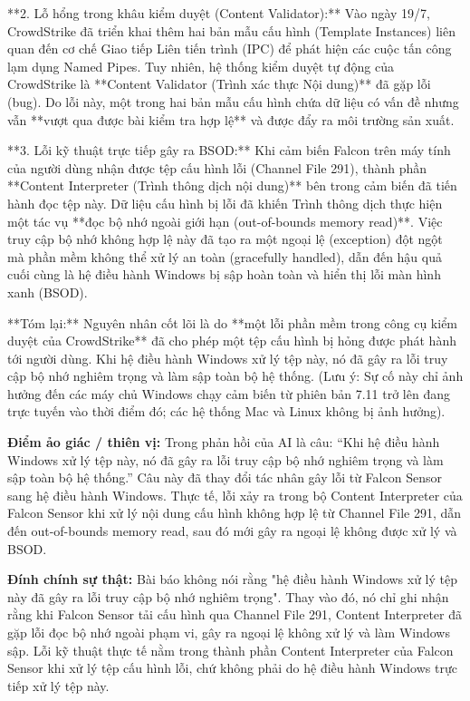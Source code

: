**2. Lỗ hổng trong khâu kiểm duyệt (Content Validator):**
Vào ngày 19/7, CrowdStrike đã triển khai thêm hai bản mẫu cấu hình (Template Instances) liên quan đến cơ chế Giao tiếp Liên tiến trình (IPC) để phát hiện các cuộc tấn công lạm dụng Named Pipes.
Tuy nhiên, hệ thống kiểm duyệt tự động của CrowdStrike là **Content Validator (Trình xác thực Nội dung)** đã gặp lỗi (bug). Do lỗi này, một trong hai bản mẫu cấu hình chứa dữ liệu có vấn đề nhưng vẫn **vượt qua được bài kiểm tra hợp lệ** và được đẩy ra môi trường sản xuất.

**3. Lỗi kỹ thuật trực tiếp gây ra BSOD:**
Khi cảm biến Falcon trên máy tính của người dùng nhận được tệp cấu hình lỗi (Channel File 291), thành phần **Content Interpreter (Trình thông dịch nội dung)** bên trong cảm biến đã tiến hành đọc tệp này.
Dữ liệu cấu hình bị lỗi đã khiến Trình thông dịch thực hiện một tác vụ **đọc bộ nhớ ngoài giới hạn (out-of-bounds memory read)**. Việc truy cập bộ nhớ không hợp lệ này đã tạo ra một ngoại lệ (exception) đột ngột mà phần mềm không thể xử lý an toàn (gracefully handled), dẫn đến hậu quả cuối cùng là hệ điều hành Windows bị sập hoàn toàn và hiển thị lỗi màn hình xanh (BSOD).

**Tóm lại:** Nguyên nhân cốt lõi là do **một lỗi phần mềm trong công cụ kiểm duyệt của CrowdStrike** đã cho phép một tệp cấu hình bị hỏng được phát hành tới người dùng. Khi hệ điều hành Windows xử lý tệp này, nó đã gây ra lỗi truy cập bộ nhớ nghiêm trọng và làm sập toàn bộ hệ thống. (Lưu ý: Sự cố này chỉ ảnh hưởng đến các máy chủ Windows chạy cảm biến từ phiên bản 7.11 trở lên đang trực tuyến vào thời điểm đó; các hệ thống Mac và Linux không bị ảnh hưởng).

\textbf{Điểm ảo giác / thiên vị:}
Trong phản hồi của AI là câu: “Khi hệ điều hành Windows xử lý tệp này, nó đã gây ra lỗi truy cập bộ nhớ nghiêm trọng và làm sập toàn bộ hệ thống.” Câu này đã thay đổi tác nhân gây lỗi từ Falcon Sensor sang hệ điều hành Windows. Thực tế, lỗi xảy ra trong bộ Content Interpreter của Falcon Sensor khi xử lý nội dung cấu hình không hợp lệ từ Channel File 291, dẫn đến out-of-bounds memory read, sau đó mới gây ra ngoại lệ không được xử lý và BSOD.

\textbf{Đính chính sự thật:}
Bài báo không nói rằng "hệ điều hành Windows xử lý tệp này đã gây ra lỗi truy cập bộ nhớ nghiêm trọng". Thay vào đó, nó chỉ ghi nhận rằng khi Falcon Sensor tải cấu hình qua Channel File 291, Content Interpreter đã gặp lỗi đọc bộ nhớ ngoài phạm vi, gây ra ngoại lệ không xử lý và làm Windows sập. Lỗi kỹ thuật thực tế nằm trong thành phần Content Interpreter của Falcon Sensor khi xử lý tệp cấu hình lỗi, chứ không phải do hệ điều hành Windows trực tiếp xử lý tệp này.

